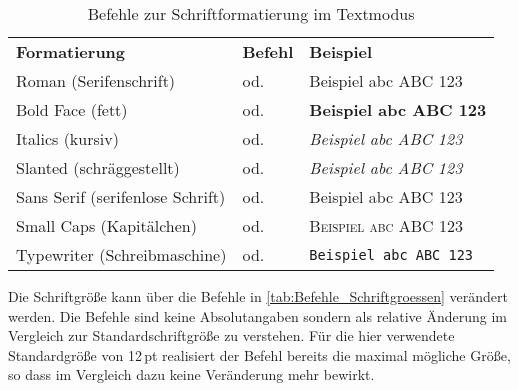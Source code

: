 \begin{table}%
    \centering%
    \caption[Befehle zur Schriftformatierung im Textmodus]{Befehle zur Schriftformatierung im Textmodus \cite{fntguide} \label{tab:Befehle_Schriftformatierung_Textmodus}}%
    \begin{tabular}{lll}%
        \toprule %
        \textbf{Formatierung}            & \textbf{Befehl}                                & \textbf{Beispiel}             \\ \cmidrule(r){1-1}\cmidrule(lr){2-2}\cmidrule(l){3-3} %
        Roman (Serifenschrift)           & \command{\textrm{...}} od. \command{\rmfamily} & \textrm{Beispiel abc ABC 123} \\
        Bold Face (fett)                 & \command{\textbf{...}} od. \command{\bfseries} & \textbf{Beispiel abc ABC 123} \\
        Italics (kursiv)                 & \command{\textit{...}} od. \command{\itshape}  & \textit{Beispiel abc ABC 123} \\
        Slanted (schräggestellt)         & \command{\textsl{...}} od. \command{\slshape}  & \textsl{Beispiel abc ABC 123} \\
        Sans Serif (serifenlose Schrift) & \command{\textsf{...}} od. \command{\sffamily} & \textsf{Beispiel abc ABC 123} \\
        Small Caps (Kapitälchen)         & \command{\textsc{...}} od. \command{\scshape}  & \textsc{Beispiel abc ABC 123} \\
        Typewriter (Schreibmaschine)     & \command{\texttt{...}} od. \command{\ttfamily} & \texttt{Beispiel abc ABC 123} \\
        \bottomrule %
    \end{tabular}%
\end{table}%

Die Schriftgröße kann über die Befehle in \cref{tab:Befehle_Schriftgroessen} verändert werden. Die Befehle sind keine Absolutangaben sondern als relative Änderung im Vergleich zur Standardschriftgröße zu verstehen. Für die hier verwendete Standardgröße von 12\,pt realisiert der Befehl \command{\huge} bereits die maximal mögliche Größe, so dass im Vergleich dazu \command{\Huge} keine Veränderung mehr bewirkt.

%

